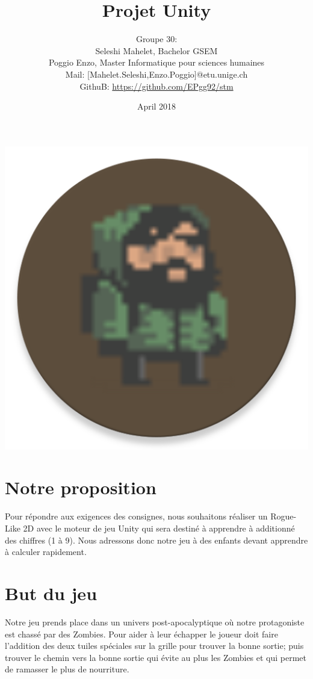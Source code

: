 \documentclass[onecolumn, 12pt]{article}
\title{Projet Unity}
\author{Groupe 30:\\ Seleshi Mahelet, Bachelor GSEM \\ Poggio Enzo, Master
Informatique pour sciences humaines\\ Mail:
{[}Mahelet.Seleshi,Enzo.Poggio{]}@etu.unige.ch\\ GithuB:
\url{https://github.com/EPgg92/stm} }
\date{April 2018}
\begin{document}
\maketitle
\begin{center}

\includegraphics[scale=0.5]{../Deckstop_icons/icon.png}
\end{center}

\section{Notre proposition}\label{notre-proposition}

Pour répondre aux exigences des consignes, nous souhaitons réaliser un
Rogue-Like 2D avec le moteur de jeu Unity qui sera destiné à apprendre à
additionné des chiffres (1 à 9). Nous adressons donc notre jeu à des
enfants devant apprendre à calculer rapidement.

\section{But du jeu}\label{but-du-jeu}

Notre jeu prends place dans un univers post-apocalyptique où
notre protagoniste est chassé par des Zombies. Pour aider à leur
échapper le joueur doit faire l'addition des deux tuiles spéciales sur
la grille pour trouver la bonne sortie; puis trouver le chemin vers la
bonne sortie qui évite au plus les Zombies et qui permet de ramasser le
plus de nourriture.
\end{document}
